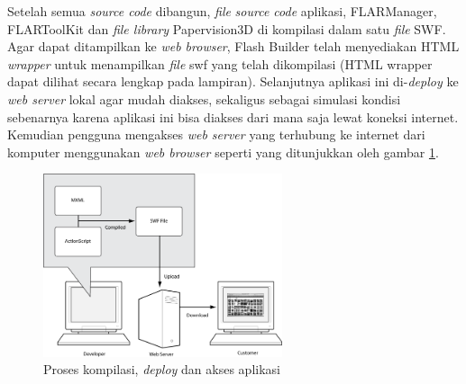 Setelah semua \textit{source code} dibangun, \textit{file} \textit{source code} aplikasi, FLARManager, FLARToolKit dan \textit{file library} Papervision3D di kompilasi dalam satu \textit{file} SWF. Agar dapat ditampilkan ke \textit{web browser}, Flash Builder telah menyediakan HTML \textit{wrapper} untuk menampilkan \textit{file} swf yang telah dikompilasi (HTML wrapper dapat dilihat secara lengkap pada lampiran). Selanjutnya aplikasi ini di-\textit{deploy} ke \textit{web server} lokal agar mudah diakses, sekaligus sebagai simulasi kondisi sebenarnya karena aplikasi ini bisa diakses dari mana saja lewat koneksi internet. Kemudian pengguna mengakses \textit{web server} yang terhubung ke internet dari komputer menggunakan \textit{web browser} seperti yang ditunjukkan oleh gambar \ref{fig:as_to_swf}.

\begin{figure}[h]
\begin{center}
\includegraphics[width=7cm]{./images/as_to_swf}
\caption{\label{fig:as_to_swf} Proses kompilasi, \textit{deploy} dan akses aplikasi}
\end{center}
\end{figure}

